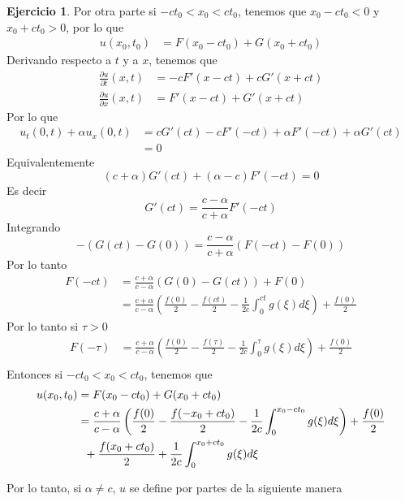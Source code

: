 \documentclass{article}
\theoremstyle{plain}
\theoremstyle{definition}
\newtheorem{ex}[proposición]{Ejercicio}
\begin{document}
\begin{ex}
Por otra parte si \(-ct_0 < x_0 < ct_0\), tenemos que $x_0 - ct_0 < 0$ y $x_0 + ct_0 > 0$, por lo que
\begin{align*}
    u(x_0,t_0) &= F(x_0-ct_0) + G(x_0+ct_0)
\end{align*}
Derivando respecto a \(t\) y a \(x\), tenemos que
\begin{align*}
    \frac{\partial u}{\partial t}(x,t) &= -cF'(x-ct) + cG'(x+ct)\\
    \frac{\partial u}{\partial x}(x,t) &= F'(x-ct) + G'(x+ct)
\end{align*}
Por lo que
\begin{align*}
    u_t(0,t) + \alpha u_x(0,t) &= cG'(ct) - cF'(-ct) + \alpha F'(-ct) + \alpha G'(ct)\\
    &= 0
\end{align*}
Equivalentemente
\[
    (c + \alpha )G'(ct) + (\alpha -c)F'(-ct) = 0
\]
Es decir
\[
    G'(ct) = \frac{c -\alpha}{c + \alpha }F'(-ct)
\]
Integrando
\[
    -(G(ct) - G(0)) = \frac{c -\alpha}{c + \alpha }(F(-ct)-F(0))
\]
Por lo tanto 
\begin{align*}
    F(-ct) &= \frac{c +\alpha}{c - \alpha }(G(0) - G(ct)) + F(0)\\
    &= \frac{c +\alpha}{c - \alpha }\left(\frac{f(0)}{2} - \frac{f(ct)}{2} - \frac{1}{2c} \int_{0}^{ct} g(\xi) d\xi\right) + \frac{f(0)}{2}
\end{align*}
Por lo tanto si $\tau > 0$
\begin{align*}
    F(-\tau) &= \frac{c + \alpha}{c - \alpha }\left(\frac{f(0)}{2} - \frac{f(\tau)}{2} - \frac{1}{2c} \int_{0}^{\tau} g(\xi) d\xi\right) + \frac{f(0)}{2}\\
\end{align*}
Entonces si \(-ct_0<x_0 < ct_0\), tenemos que
\begin{align*}
    u(x_0,t_0) &= F(x_0-ct_0) + G(x_0+ct_0)\\
    &= \frac{c + \alpha}{c - \alpha }\left(\frac{f(0)}{2} - \frac{f(-x_0+ct_0)}{2} - \frac{1}{2c} \int_{0}^{x_0-ct_0} g(\xi) d\xi\right) + \frac{f(0)}{2}\\
    &\hspace{2mm} + \frac{f(x_0+ct_0)}{2} + \frac{1}{2c} \int_{0}^{x_0+ct_0} g(\xi) d\xi
\end{align*}

Por lo tanto, si $\alpha \neq c$, $u$ se define por partes de la siguiente manera


\end{ex}
\end{document}
